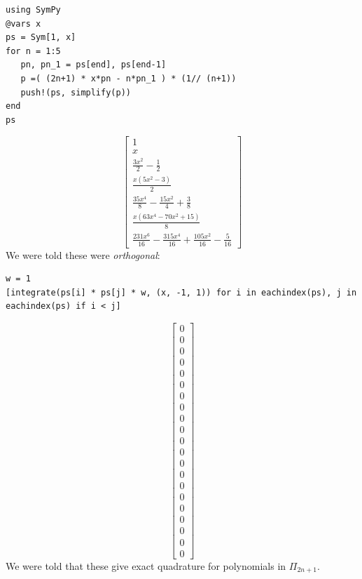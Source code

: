 \documentclass[12pt]{article}
\begin{document}
\begin{Verbatim}[framesep=1mm,frame=leftline,fontfamily=courier,formatcom=\color{darker-gray}]
using SymPy
@vars x
ps = Sym[1, x]
for n = 1:5
   pn, pn_1 = ps[end], ps[end-1]
   p =( (2n+1) * x*pn - n*pn_1 ) * (1// (n+1))
   push!(ps, simplify(p))
end
ps
\end{Verbatim}
\[ \left[ \begin{array}{r}1\\x\\\frac{3 x^{2}}{2} - \frac{1}{2}\\\frac{x \left(5 x^{2} - 3\right)}{2}\\\frac{35 x^{4}}{8} - \frac{15 x^{2}}{4} + \frac{3}{8}\\\frac{x \left(63 x^{4} - 70 x^{2} + 15\right)}{8}\\\frac{231 x^{6}}{16} - \frac{315 x^{4}}{16} + \frac{105 x^{2}}{16} - \frac{5}{16}\end{array} \right] \]
We were told these were \textit{orthogonal}:

\begin{Verbatim}[framesep=1mm,frame=leftline,fontfamily=courier,formatcom=\color{darker-gray}]
w = 1
[integrate(ps[i] * ps[j] * w, (x, -1, 1)) for i in eachindex(ps), j in eachindex(ps) if i < j]
\end{Verbatim}
\[ \left[ \begin{array}{r}0\\0\\0\\0\\0\\0\\0\\0\\0\\0\\0\\0\\0\\0\\0\\0\\0\\0\\0\\0\\0\end{array} \right] \]
We were told that these give exact quadrature for polynomials in $\Pi_{2n+1}$.
\end{document}
